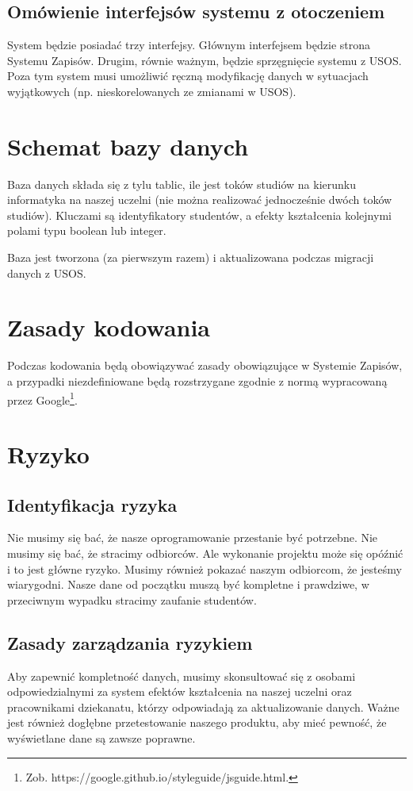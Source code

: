 \documentclass{article}
\begin{document}
\subsection{Omówienie interfejsów systemu z otoczeniem}
System będzie posiadać trzy interfejsy.
Głównym interfejsem będzie strona Systemu Zapisów.
Drugim, równie ważnym, będzie sprzęgnięcie systemu z USOS.
Poza tym system musi umożliwić ręczną modyfikację danych w sytuacjach wyjątkowych (np. nieskorelowanych ze zmianami w USOS).


\section{Schemat bazy danych}
Baza danych składa się z tylu tablic, ile jest toków studiów na kierunku informatyka na naszej uczelni (nie można realizować jednocześnie dwóch toków studiów).
Kluczami są identyfikatory studentów, a efekty kształcenia kolejnymi polami typu boolean lub integer.

Baza jest tworzona (za pierwszym razem) i aktualizowana podczas migracji danych z USOS.


\section{Zasady kodowania}
Podczas kodowania będą obowiązywać zasady obowiązujące w Systemie Zapisów, a przypadki niezdefiniowane będą rozstrzygane zgodnie z normą wypracowaną przez Google\footnote{Zob. https://google.github.io/styleguide/jsguide.html.}.


\newpage


\section{Ryzyko}

\subsection{Identyfikacja ryzyka}
Nie musimy się bać, że nasze oprogramowanie przestanie być potrzebne. Nie musimy się bać, że stracimy odbiorców. Ale wykonanie projektu może się opóźnić i to jest główne ryzyko.
Musimy również pokazać naszym odbiorcom, że jesteśmy wiarygodni. Nasze dane od początku muszą być kompletne i prawdziwe, w przeciwnym wypadku stracimy zaufanie studentów.

\subsection{Zasady zarządzania ryzykiem}
Aby zapewnić kompletność danych, musimy skonsultować się z osobami odpowiedzialnymi za system efektów kształcenia na naszej uczelni oraz pracownikami dziekanatu, którzy odpowiadają za aktualizowanie danych.
Ważne jest również dogłębne przetestowanie naszego produktu, aby mieć pewność, że wyświetlane dane są zawsze poprawne.
\end{document}
